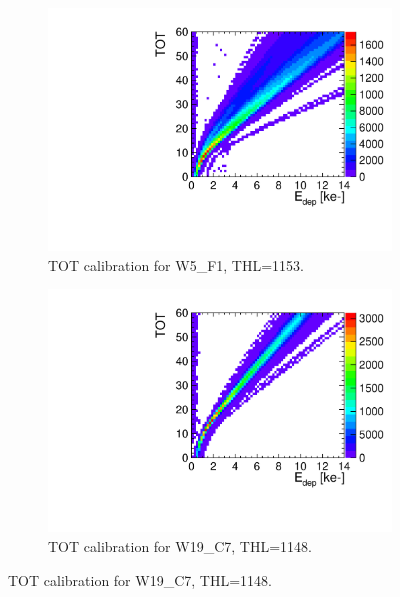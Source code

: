 \begin{figure}[htbp] \centering
  \begin{subfigure}[b]{0.45\textwidth}
    \includegraphics[width=\textwidth]{./figures/Calibration/TOTcalibration_W0005_F01_thresh1153.pdf}
    \caption{TOT calibration for W5\_F1, THL=1153.}
    \label{fig:TOTcalibW5F1}
  \end{subfigure}\hfill
  \begin{subfigure}[b]{0.45\textwidth}
    \includegraphics[width=\textwidth]{./figures/Calibration/TOTcalibration_W0019_C07_thresh1148.pdf}
    \caption{TOT calibration for W19\_C7, THL=1148.}
    \label{fig:TOTcalibW19C7}
  \end{subfigure}
\end{figure}



